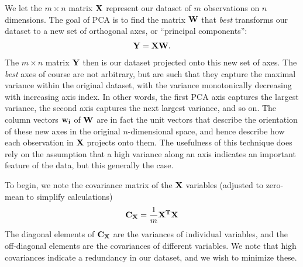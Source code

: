 We let the $m\times n$ matrix $\mathbf{X}$ represent our dataset of $m$ observations on $n$ dimensions. The goal of PCA is to find the matrix $\mathbf{W}$ that \textit{best} transforms our dataset to a new set of orthogonal axes, or ``principal components'':
\begin{align*}
	\mathbf{Y} = \mathbf{X}\mathbf{W}.
\end{align*}
The $m\times n$ matrix $\mathbf{Y}$ then is our dataset projected onto this new set of axes. The \textit{best} axes of course are not arbitrary, but are such that they capture the maximal variance within the original dataset, with the variance monotonically decreasing with increasing axis index. In other words, the first PCA axis captures the largest variance, the second axis captures the next largest variance, and so on.
The column vectors $\mathbf{w_i}$ of $\mathbf{W}$ are in fact the unit vectors that describe the orientation of these new axes in the original $n$-dimensional space, and hence describe how each observation in $\mathbf{X}$ projects onto them.
The usefulness of this technique does rely on the assumption that a high variance along an axis indicates an important feature of the data, but this generally the case.

To begin, we note the covariance matrix of the $\mathbf{X}$ variables (adjusted to zero-mean to simplify calculations)
\begin{align*}
	\mathbf{C_X} = \frac{1}{m}\mathbf{X^TX}
\end{align*}
The diagonal elements of $\mathbf{C_X}$ are the variances of individual variables, and the off-diagonal elements are the covariances of different variables. We note that high covariances indicate a redundancy in our dataset, and we wish to minimize these.

